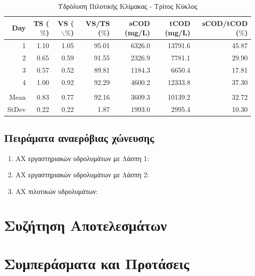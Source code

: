 \documentclass[11pt]{report}
\begin{document}
\begin{table}[htbp]
\caption{\label{tab:org41c4e9d}Υδρόλυση Πιλοτικής Κλίμακας - Τρίτος Κύκλος}
\centering
\begin{tabular}{rrrrrrr}
Day & TS (\(\%\)) & VS ($\backslash$\(\%\)) & VS/TS (\(\%\)) & sCOD (mg/L) & tCOD (mg/L) & sCOD/tCOD (\(\%\))\\[0pt]
\hline
1 & 1.10 & 1.05 & 95.01 & 6326.0 & 13791.6 & 45.87\\[0pt]
2 & 0.65 & 0.59 & 91.55 & 2326.9 & 7781.1 & 29.90\\[0pt]
3 & 0.57 & 0.52 & 89.81 & 1184.3 & 6650.4 & 17.81\\[0pt]
4 & 1.00 & 0.92 & 92.29 & 4600.2 & 12333.8 & 37.30\\[0pt]
 &  &  &  &  &  & \\[0pt]
Mean & 0.83 & 0.77 & 92.16 & 3609.3 & 10139.2 & 32.72\\[0pt]
StDev & 0.22 & 0.22 & 1.87 & 1993.0 & 2995.4 & 10.30\\[0pt]
\end{tabular}
\end{table}

\section{Πειράματα αναερόβιας χώνευσης}
\label{sec:org16e88db}

\begin{enumerate}
\item ΑΧ εργαστηριακών υδρολυμάτων με Λάσπη 1:
\label{sec:org0076b27}

\item ΑΧ εργαστηριακών υδρολυμάτων με Λάσπη 2:
\label{sec:orgedf64f4}

\item AX πιλοτικών υδρολυμάτων:
\label{sec:org9911879}
\end{enumerate}

\chapter{Συζήτηση Αποτελεσμάτων}
\label{sec:orgfef721f}
\label{sec:result_discussion}

\chapter{Συμπεράσματα και Προτάσεις}
\label{sec:org632b076}
\label{sec:conclusion}
\end{document}
